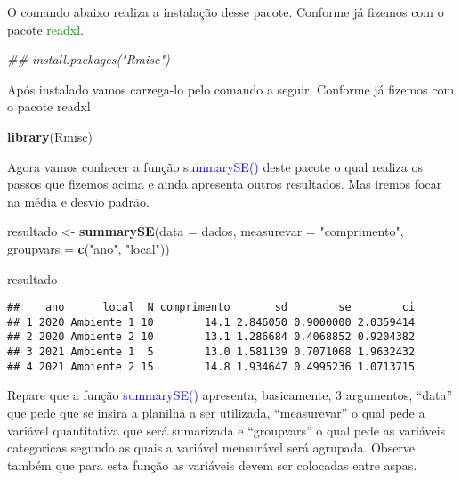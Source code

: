 \documentclass[titlepage, oneside, openany, a4paper]{book}
\newenvironment{Shaded}{\begin{snugshade}}{\end{snugshade}}
\newcommand{\CommentTok}[1]{\textcolor[rgb]{0.56,0.35,0.01}{\textit{#1}}}
\newcommand{\DataTypeTok}[1]{\textcolor[rgb]{0.13,0.29,0.53}{#1}}
\newcommand{\KeywordTok}[1]{\textcolor[rgb]{0.13,0.29,0.53}{\textbf{#1}}}
\newcommand{\NormalTok}[1]{#1}
\newcommand{\StringTok}[1]{\textcolor[rgb]{0.31,0.60,0.02}{#1}}
\begin{document}
O comando abaixo realiza a instalação desse pacote. Conforme já fizemos com o pacote \textcolor{green}{readxl}.

\begin{Shaded}
\begin{Highlighting}[]
\CommentTok{## install.packages("Rmisc")}
\end{Highlighting}
\end{Shaded}

Após instalado vamos carrega-lo pelo comando a seguir. Conforme já fizemos com o pacote readxl

\begin{Shaded}
\begin{Highlighting}[]
\KeywordTok{library}\NormalTok{(Rmisc)}
\end{Highlighting}
\end{Shaded}

Agora vamos conhecer a função \textcolor{blue}{summarySE()} deste pacote o qual realiza os passos que fizemos acima e ainda apresenta outros resultados. Mas iremos focar na média e desvio padrão.

\begin{Shaded}
\begin{Highlighting}[]
\NormalTok{resultado <-}\StringTok{ }\KeywordTok{summarySE}\NormalTok{(}\DataTypeTok{data =}\NormalTok{ dados, }
                       \DataTypeTok{measurevar =} \StringTok{"comprimento"}\NormalTok{, }
                       \DataTypeTok{groupvars =} \KeywordTok{c}\NormalTok{(}\StringTok{"ano"}\NormalTok{, }\StringTok{"local"}\NormalTok{))}

\NormalTok{resultado}
\end{Highlighting}
\end{Shaded}

\begin{verbatim}
##    ano      local  N comprimento       sd        se        ci
## 1 2020 Ambiente 1 10        14.1 2.846050 0.9000000 2.0359414
## 2 2020 Ambiente 2 10        13.1 1.286684 0.4068852 0.9204382
## 3 2021 Ambiente 1  5        13.0 1.581139 0.7071068 1.9632432
## 4 2021 Ambiente 2 15        14.8 1.934647 0.4995236 1.0713715
\end{verbatim}

Repare que a função \textcolor{blue}{summarySE()} apresenta, basicamente, 3 argumentos, ``data'' que pede que se insira a planilha a ser utilizada, ``measurevar'' o qual pede a variável quantitativa que será sumarizada e ``groupvars'' o qual pede as variáveis categoricas segundo as quais a variável mensurável será agrupada. Observe também que para esta função as variáveis devem ser colocadas entre aspas.
\end{document}
